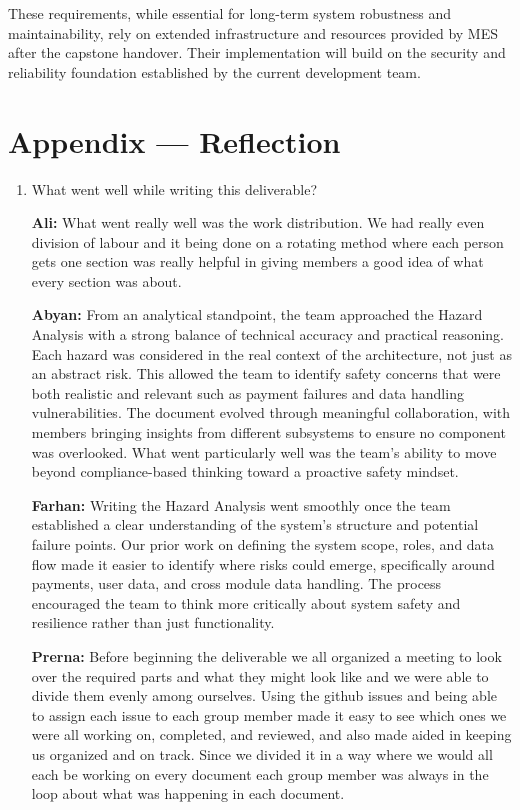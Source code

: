 \documentclass{article}
\begin{document}
These requirements, while essential for long-term system robustness and maintainability, rely on extended infrastructure and resources provided by MES after the capstone handover. Their implementation will build on the security and reliability foundation established by the current development team.


\newpage{}

\section*{Appendix --- Reflection}




\begin{enumerate}
    \item What went well while writing this deliverable? 
    
    \textbf{Ali:} What went really well was the work distribution. We had really even division of labour and it being done on a rotating method where each person gets one section was really helpful in giving members a good idea of what every section was about.

    \textbf{Abyan:} From an analytical standpoint, the team approached the Hazard Analysis with a strong balance of technical accuracy and practical reasoning. Each hazard was considered in the real context of the architecture, not just as an abstract risk. This allowed the team to identify safety concerns that were both realistic and relevant such as payment failures and data handling vulnerabilities. The document evolved through meaningful collaboration, with members bringing insights from different subsystems to ensure no component was overlooked. What went particularly well was the team’s ability to move beyond compliance-based thinking toward a proactive safety mindset.

    \textbf{Farhan:} Writing the Hazard Analysis went smoothly once the team established a clear understanding of the system’s structure and potential failure points. Our prior work on defining the system scope, roles, and data flow made it easier to identify where risks could emerge, specifically around payments, user data, and cross module data handling. The process encouraged the team to think more critically about system safety and resilience rather than just functionality.

    \textbf{Prerna:} Before beginning the deliverable we all organized a meeting to look over the required parts and what they might look like and we were able to divide them evenly among ourselves. Using the github issues and being able to assign each issue to each group member made it easy to see which ones we were all working on, completed, and reviewed, and also made aided in keeping us organized and on track. Since we divided it in a way where we would all each be working on every document each group member was always in the loop about what was happening in each document.


\end{enumerate}
\end{document}
